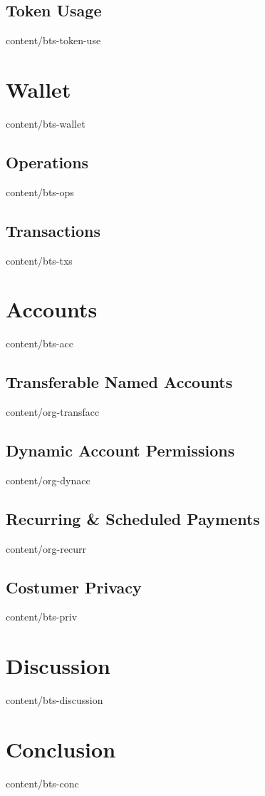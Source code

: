 \documentclass[conference,final,10pt,a4paper]{IEEEtran}
\begin{document}
\subsection    { Token Usage                     }  { content/bts-token-use   } 

\section       { Wallet                          }  { content/bts-wallet      } 
\subsection    { Operations                      }  { content/bts-ops         } 
\subsection    { Transactions                    }  { content/bts-txs         } 

\section       { Accounts                        }  { content/bts-acc         } 
\subsection    { Transferable Named Accounts     }  { content/org-transfacc   } 
\subsection    { Dynamic Account Permissions     }  { content/org-dynacc      } 
\subsection    { Recurring \& Scheduled Payments }  { content/org-recurr      } 
\subsection    { Costumer Privacy                }  { content/bts-priv        } 

\section       { Discussion                      }  { content/bts-discussion  } 

\section       { Conclusion                      }  { content/bts-conc        } 


\end{document}
